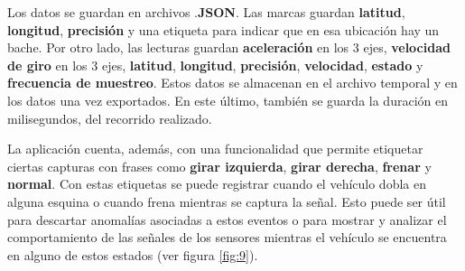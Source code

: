 	Los datos se guardan en archivos .\textbf{JSON}. Las marcas guardan \textbf{latitud}, \textbf{longitud}, \textbf{precisión} y una 
	etiqueta para indicar que en esa ubicación hay un bache. Por otro lado, las lecturas guardan \textbf{aceleración} en los 3 ejes, 
	\textbf{velocidad de giro} en los 3 ejes, \textbf{latitud}, \textbf{longitud}, \textbf{precisión}, \textbf{velocidad}, \textbf{estado}
	y \textbf{frecuencia de muestreo}. Estos datos se almacenan en el archivo temporal y en los datos una vez exportados. En este último, también 
	se guarda la duración en milisegundos, del recorrido realizado.

	La aplicación cuenta, además, con una funcionalidad que permite etiquetar ciertas capturas con frases como \textbf{girar izquierda},
	\textbf{girar derecha}, \textbf{frenar} y \textbf{normal}. Con estas etiquetas se puede registrar cuando el vehículo dobla en alguna
	esquina o cuando frena mientras se captura la señal. Esto puede ser útil para descartar anomalías asociadas a estos eventos o
	para mostrar y analizar el comportamiento de las señales de los sensores mientras el vehículo se encuentra en alguno de estos estados
	(ver figura \ref{fig:9}).

